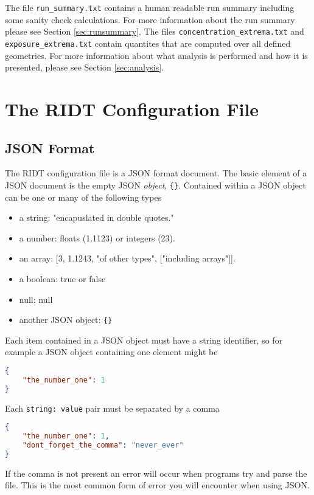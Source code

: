 \documentclass[]{article}
\def\code#1{\texttt{#1}}
\begin{document}
\noindent The file \code{run\_summary.txt} contains a human readable run summary
including some sanity check calculations. For more information about the run
summary please see Section \ref{sec:runsummary}. The files
\code{concentration\_extrema.txt} and \code{exposure\_extrema.txt} contain
quantites that are computed over all defined geometries. For more information
about what analysis is performed and how it is presented, please see Section
\ref{sec:analysis}.

\section{The RIDT Configuration File}\label{sec:configfile}
\subsection{JSON Format}

The RIDT configuration file is a JSON format document. The basic element of a
JSON document is the empty JSON \emph{object}, \code{\{\}}. Contained within
a JSON object can be one or many of the following types
\begin{itemize}
    \item a string: "encapuslated in double quotes."
    \item a number: floats (1.1123) or integers (23).
    \item an array: [3, 1.1243, "of other types", ["including arrays"]].
    \item a boolean: true or false
    \item null: null
    \item another JSON object: \code{\{\}}
\end{itemize}
Each item contained in a JSON object must have a string identifier, so for
example a JSON object containing one element might be\\
\begin{lstlisting}[language=json,firstnumber=1]
{
    "the_number_one": 1
}
\end{lstlisting}
\medskip
Each \code{string: value} pair must be separated by a comma\\
\begin{lstlisting}[language=json,firstnumber=1]
{
    "the_number_one": 1,
    "dont_forget_the_comma": "never_ever"
}
\end{lstlisting}
\medskip
If the comma is not present an error will occur when programs try and parse the
file. This is the most common form of error you will encounter when using
JSON.\\
\end{document}
